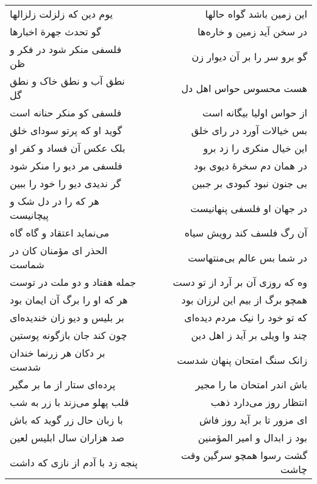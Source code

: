 \begin{center}
\begin{longtable}{l p{0.5cm} r}
یوم دین که زلزلت زلزالها
&&
این زمین باشد گواه حالها
\\
گو تحدث جهرة اخبارها
&&
در سخن آید زمین و خاره‌ها
\\
فلسفی منکر شود در فکر و ظن
&&
گو برو سر را بر آن دیوار زن
\\
نطق آب و نطق خاک و نطق گل
&&
هست محسوس حواس اهل دل
\\
فلسفی کو منکر حنانه است
&&
از حواس اولیا بیگانه است
\\
گوید او که پرتو سودای خلق
&&
بس خیالات آورد در رای خلق
\\
بلک عکس آن فساد و کفر او
&&
این خیال منکری را زد برو
\\
فلسفی مر دیو را منکر شود
&&
در همان دم سخرهٔ دیوی بود
\\
گر ندیدی دیو را خود را ببین
&&
بی جنون نبود کبودی بر جبین
\\
هر که را در دل شک و پیچانیست
&&
در جهان او فلسفی پنهانیست
\\
می‌نماید اعتقاد و گاه گاه
&&
آن رگ فلسف کند رویش سیاه
\\
الحذر ای مؤمنان کان در شماست
&&
در شما بس عالم بی‌منتهاست
\\
جمله هفتاد و دو ملت در توست
&&
وه که روزی آن بر آرد از تو دست
\\
هر که او را برگ آن ایمان بود
&&
همچو برگ از بیم این لرزان بود
\\
بر بلیس و دیو زان خندیده‌ای
&&
که تو خود را نیک مردم دیده‌ای
\\
چون کند جان بازگونه پوستین
&&
چند وا ویلی بر آید ز اهل دین
\\
بر دکان هر زرنما خندان شدست
&&
زانک سنگ امتحان پنهان شدست
\\
پرده‌ای ستار از ما بر مگیر
&&
باش اندر امتحان ما را مجیر
\\
قلب پهلو می‌زند با زر به شب
&&
انتظار روز می‌دارد ذهب
\\
با زبان حال زر گوید که باش
&&
ای مزور تا بر آید روز فاش
\\
صد هزاران سال ابلیس لعین
&&
بود ز ابدال و امیر المؤمنین
\\
پنجه زد با آدم از نازی که داشت
&&
گشت رسوا همچو سرگین وقت چاشت
\\
\end{longtable}
\end{center}
